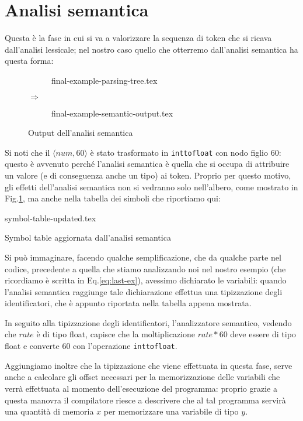 \documentclass[class=book, crop=false, oneside, 12pt]{standalone}
\begin{document}
\section{Analisi semantica}
Questa è la fase in cui si va a valorizzare la sequenza di token che si ricava dall'analisi lessicale; nel nostro caso quello che otterremo dall'analisi semantica ha questa forma:
\begin{figure}[H]
    \centering
    \begin{subfigure}{.45\textwidth}
        \centering
        {final-example-parsing-tree.tex}
    \end{subfigure}%
    {\Huge$\Rightarrow$}%
    \begin{subfigure}{.45\textwidth}
        \centering
        {final-example-semantic-output.tex}
    \end{subfigure}
    \caption{Output dell'analisi semantica}
    \label{fig:last-ex-semantic-output}
\end{figure}
Si noti che il \(\langle num, 60 \rangle \) è stato trasformato in \texttt{inttofloat} con nodo figlio \(60\): questo è avvenuto perché l'analisi semantica è quella che si occupa di attribuire un valore (e di conseguenza anche un tipo) ai token. Proprio per questo motivo, gli effetti dell'analisi semantica non si vedranno solo nell'albero, come mostrato in Fig.\ref{fig:last-ex-semantic-output}, ma anche nella tabella dei simboli che riportiamo qui:
\begin{table}[H]
	\centering
	{symbol-table-updated.tex}
    \caption{Symbol table aggiornata dall'analisi semantica}
    \label{tab:last-ex-symbol-table-updated}
\end{table}
Si può immaginare, facendo qualche semplificazione, che da qualche parte nel codice, precedente a quella che stiamo analizzando noi nel nostro esempio (che ricordiamo è scritta in Eq.\ref{eq:last-ex}), avessimo dichiarato le variabili: quando l'analisi semantica raggiunge tale dichiarazione effettua una tipizzazione degli identificatori, che è appunto riportata nella tabella appena mostrata.

In seguito alla tipizzazione degli identificatori, l'analizzatore semantico, vedendo che \(rate\) è di tipo float, capisce che la moltiplicazione \(rate * 60\) deve essere di tipo float e converte \(60\) con l'operazione \texttt{inttofloat}.

Aggiungiamo inoltre che la tipizzazione che viene effettuata in questa fase, serve anche a calcolare gli offset necessari per la memorizzazione delle variabili che verrà effettuata al momento dell'esecuzione del programma: proprio grazie a questa manovra il compilatore riesce a descrivere che al tal programma servirà una quantità di memoria \(x\) per memorizzare una variabile di tipo \(y\).
\end{document}
